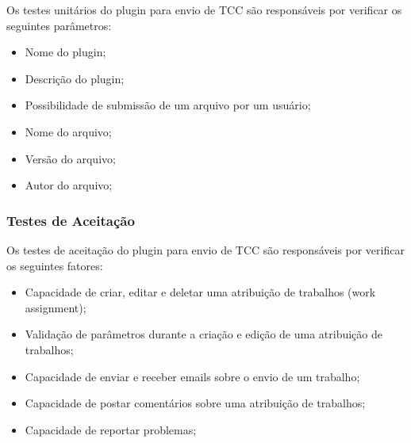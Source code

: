 Os testes unitários do plugin para envio de TCC são responsáveis por verificar os seguintes parâmetros:

\begin{itemize}
\item Nome do plugin;
\item Descrição do plugin;
\item Possibilidade de submissão de um arquivo por um usuário;
\item Nome do arquivo;
\item Versão do arquivo;
\item Autor do arquivo;
\end{itemize}

\subsubsection{Testes de Aceitação}

Os testes de aceitação do plugin para envio de TCC são responsáveis por verificar os seguintes fatores:

\begin{itemize}
\item Capacidade de criar, editar e deletar uma atribuição de trabalhos (work assignment);
\item Validação de parâmetros durante a criação e edição de uma atribuição de trabalhos;
\item Capacidade de enviar e receber emails sobre o envio de um trabalho;
\item Capacidade de postar comentários sobre uma atribuição de trabalhos;
\item Capacidade de reportar problemas;
\end{itemize}